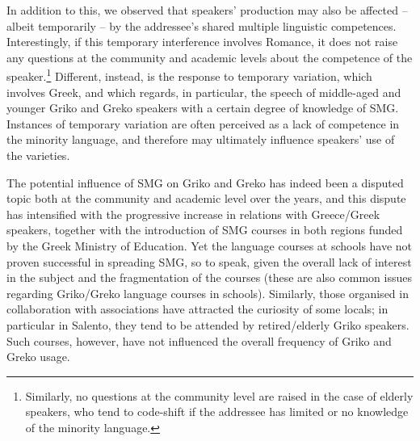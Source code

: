 \documentclass[output=paper,hidelinks]{langscibook}
\begin{document}
In addition to this, we observed that speakers’ production may also be affected -- albeit temporarily -- by the addressee’s shared multiple linguistic competences. Interestingly, if this temporary interference involves Romance, it does not raise any questions at the community and academic levels about the competence of the speaker.\footnote{Similarly, no questions at the community level are raised in the case of elderly speakers, who tend to code-shift if the addressee has limited or no knowledge of the minority language.} Different, instead, is the response to temporary variation, which involves Greek, and which regards, in particular, the speech of middle-aged and younger Griko and Greko speakers with a certain degree of knowledge of SMG. Instances of temporary variation are often perceived as a lack of competence in the minority language, and therefore may ultimately influence speakers’ use of the varieties. 



The potential influence of SMG on Griko and Greko has indeed been a disputed topic both at the community and academic level over the years, and this dispute has intensified with the progressive increase in relations with Greece/Greek speakers, together with the introduction of SMG courses in both regions funded by the Greek Ministry of Education. Yet the language courses at schools have not proven successful in spreading SMG, so to speak, given the overall lack of interest in the subject and the fragmentation of the courses (these are also common issues regarding Griko/Greko language courses in schools). Similarly, those organised in collaboration with associations have attracted the curiosity of some locals; in particular in Salento, they tend to be attended by retired/elderly Griko speakers. Such courses, however, have not influenced the overall frequency of Griko and Greko usage. 
\end{document}
